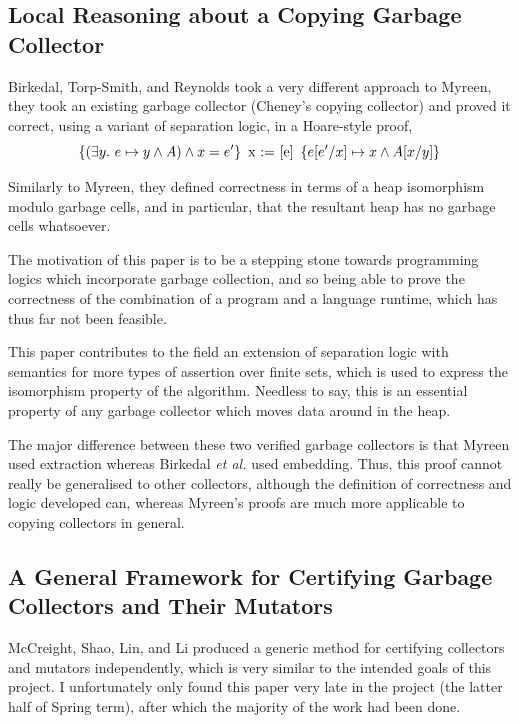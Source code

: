 \subsection{Local Reasoning about a Copying Garbage Collector}
\label{sec:lit-verifiedgc-birkedal}

Birkedal, Torp-Smith, and Reynolds\cite{Birkedal04} took a very
different approach to Myreen, they took an existing garbage collector
(Cheney's copying collector) and proved it correct, using a variant of
separation logic, in a Hoare-style proof, \[\left\{(\exists y.\ e
  \mapsto y \land A) \land x = e'\right\}\ \mbox{x := [e]}\ \left\{e[e'/x] \mapsto x \land
  A[x/y]\right\}\]

Similarly to Myreen, they defined correctness in terms of a heap
isomorphism modulo garbage cells, and in particular, that the
resultant heap has no garbage cells whatsoever.

The motivation of this paper is to be a stepping stone towards
programming logics which incorporate garbage collection, and so being
able to prove the correctness of the combination of a program and a
language runtime, which has thus far not been feasible.

This paper contributes to the field an extension of separation logic
with semantics for more types of assertion over finite sets, which is
used to express the isomorphism property of the algorithm. Needless to
say, this is an essential property of any garbage collector which
moves data around in the heap.

The major difference between these two verified garbage collectors is
that Myreen used extraction whereas Birkedal \textit{et al.} used
embedding. Thus, this proof cannot really be generalised to other
collectors, although the definition of correctness and logic developed
can, whereas Myreen's proofs are much more applicable to copying
collectors in general.

\subsection{A General Framework for Certifying Garbage Collectors and Their Mutators}
\label{sec:lit-verifying-mccreight}

McCreight, Shao, Lin, and Li\cite{McCreight07} produced a generic
method for certifying collectors and mutators independently, which is
very similar to the intended goals of this project. I unfortunately
only found this paper very late in the project (the latter half of
Spring term), after which the majority of the work had been done.


